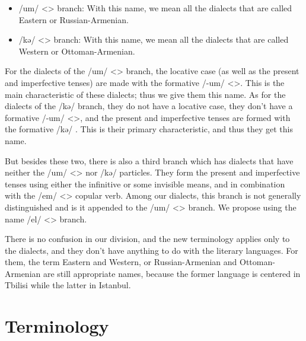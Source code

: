 \begin{adjarianpage}\label{page:35}\end{adjarianpage}%

\begin{itemize}
	\item /um/ <> branch: With this name, we mean all the dialects that are called Eastern or Russian-Armenian.
	\item /kə/ <> branch: With this name, we mean all the dialects that are called Western or Ottoman-Armenian.
	
\end{itemize}

For the dialects of the /um/ <> branch, the locative case   (as well as the present and imperfective tenses) are made with the formative /-um/ <>. This is the main characteristic of these dialects; thus we give them this name. As for the dialects of the /kə/  branch, they do not have a locative case, they don't have a formative /-um/ <>, and the present and imperfective tenses are formed with the formative /kə/ . This is their primary characteristic, and thus they get this name. 

But besides these two, there is also a third branch which has dialects that have neither the /um/ <> nor /kə/  particles. They form the present and imperfective tenses using either the infinitive or some invisible means, and in combination with the /em/ <> copular verb. Among our dialects, this branch is not generally distinguished and is it appended to the /um/ <> branch. We propose using the name /el/ <> branch. 

There is no confusion in our division, and the new terminology applies only to the dialects, and they don't have anything to do with the literary languages. For them, the term Eastern and Western, or Russian-Armenian and Ottoman-Armenian are still appropriate names, because the former language is centered in Tbilisi while the latter in Istanbul. 


\begin{adjarianpage}\label{page:36}\end{adjarianpage}%

\section{Terminology}

